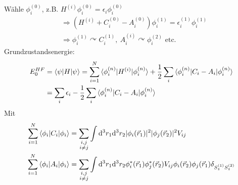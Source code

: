 Wähle $\phi_i^{(0)}$, z.B. $H^{(i)} \phi_i^{(0)} = \epsilon_i \phi_i^{(0)}$
	\begin{align*}
		&\Rightarrow \left(H^{(i)} + C_i^{(0)} - A_i^{(0)}\right) \phi_i^{(1)}
		= \epsilon_i^{(1)} \phi_i^{(1)} \\
		&\Rightarrow \phi_i^{(1)} \curvearrowright C_i^{(1)} 
		,~ A_i^{(i)} \curvearrowright \phi_i^{(2)} \text{ etc.}
	\end{align*}
Grundzustandsenergie: 
	\begin{align*}
		E_0^{HF} &= \braket{\psi | H | \psi} 
		= \sum_{i = 1}^{N} \braket{\phi_i^{(n)} | H^{(i)}| \phi_i^{(n)}}
		+ \frac{1}{2} \sum_i \braket{\phi_i^{(n)} | C_i - A_i | \phi_i^{(n)}} \\
		&= \sum_i \epsilon_i - \frac{1}{2} \sum_i \braket{\phi_i^{(n)} | C_i - A_i | \phi_i^{(n)}}
	\end{align*}
Mit 
	\begin{align*}
		\sum_{i = 1}^{N} \braket{\phi_i | C_i | \phi_i}
		&= \sum_{\substack{i,j \\ i \neq j}}\int \mathrm{d}^3 r_1 \mathrm{d}^3 r_2 |\phi_i (\vec{r}_1)|^2 |\phi_j (\vec{r}_2)|^2 V_{ij} \\
		\sum_{i = 1}^{N} \braket{\phi_i | A_i | \phi_i}
		&= \sum_{\substack{i,j \\ i \neq j}} \int \mathrm{d}^3 r_1 \mathrm{d}^3 r_2 \phi_i^* (\vec{r}_1) \phi_j^* (\vec{r}_2) 
		V_{ij} \phi_i (\vec{r}_2) \phi_j (\vec{r}_1) \delta_{S_z^{(1)} S_z^{(2)}}
	\end{align*}